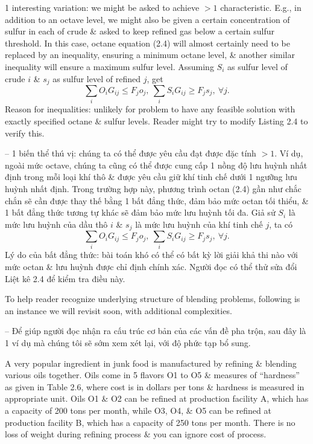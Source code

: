 \documentclass{article}
\begin{document}
\begin{itemize}
\begin{itemize}
\begin{itemize}
            1 interesting variation: we might be asked to achieve $> 1$ characteristic. E.g., in addition to an octave level, we might also be given a certain concentration of sulfur in each of crude \& asked to keep refined gas below a certain sulfur threshold. In this case, octane equation (2.4) will almost certainly need to be replaced by an inequality, ensuring a minimum octane level, \& another similar inequality will ensure a maximum sulfur level. Assuming $S_i$ as sulfur level of crude $i$ \& $s_j$ as sulfur level of refined $j$, get
            \begin{equation*}
                \sum_i O_iG_{ij}\le F_jo_j,\ \sum_i S_iG_{ij}\ge F_js_j,\ \forall j.
            \end{equation*}
            Reason for inequalities: unlikely for problem to have any feasible solution with exactly specified octane \& sulfur levels. Reader might try to modify Listing 2.4 to verify this.

            -- 1 biến thể thú vị: chúng ta có thể được yêu cầu đạt được đặc tính $> 1$. Ví dụ, ngoài mức octave, chúng ta cũng có thể được cung cấp 1 nồng độ lưu huỳnh nhất định trong mỗi loại khí thô \& được yêu cầu giữ khí tinh chế dưới 1 ngưỡng lưu huỳnh nhất định. Trong trường hợp này, phương trình octan (2.4) gần như chắc chắn sẽ cần được thay thế bằng 1 bất đẳng thức, đảm bảo mức octan tối thiểu, \& 1 bất đẳng thức tương tự khác sẽ đảm bảo mức lưu huỳnh tối đa. Giả sử $S_i$ là mức lưu huỳnh của dầu thô $i$ \& $s_j$ là mức lưu huỳnh của khí tinh chế $j$, ta có
            \begin{equation*}
                \sum_i O_iG_{ij}\le F_jo_j,\ \sum_i S_iG_{ij}\ge F_js_j,\ \forall j.
            \end{equation*}
            Lý do của bất đẳng thức: bài toán khó có thể có bất kỳ lời giải khả thi nào với mức octan \& lưu huỳnh được chỉ định chính xác. Người đọc có thể thử sửa đổi Liệt kê 2.4 để kiểm tra điều này.

            To help reader recognize underlying structure of blending problems, following is an instance we will revisit soon, with additional complexities.

            -- Để giúp người đọc nhận ra cấu trúc cơ bản của các vấn đề pha trộn, sau đây là 1 ví dụ mà chúng tôi sẽ sớm xem xét lại, với độ phức tạp bổ sung.

            A very popular ingredient in junk food is manufactured by refining \& blending various oils together. Oils come in 5 flavors O1 to O5 \& measures of ``hardness'' as given in {\sf Table 2.6}, where cost is in dollars per tons \& hardness is measured in appropriate unit. Oils O1 \& O2 can be refined at production facility A, which has a capacity of 200 tons per month, while O3, O4, \& O5 can be refined at production facility B, which has a capacity of 250 tons per month. There is no loss of weight during refining process \& you can ignore cost of process.


\end{itemize}
\end{itemize}
\end{itemize}
\end{document}
